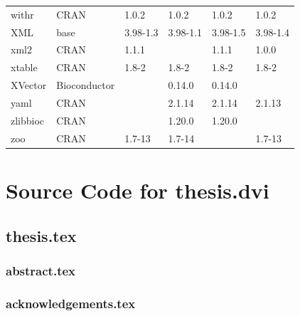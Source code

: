 \begin{longtable}{llllll}
\rowcolor{black!5}
withr                         & CRAN                      & 1.0.2       & 1.0.2       & 1.0.2          & 1.0.2              \\
\rowcolor{black!10}
XML                           & base                      & 3.98-1.3    & 3.98-1.1    & 3.98-1.5       & 3.98-1.4          \\
\rowcolor{black!5}
xml2                          & CRAN                      & 1.1.1       &             & 1.1.1          & 1.0.0              \\
\rowcolor{black!10}
xtable                        & CRAN                      & 1.8-2       & 1.8-2       & 1.8-2          & 1.8-2             \\
\rowcolor{black!5}
XVector                       & Bioconductor              &             & 0.14.0      & 0.14.0         &                    \\
\rowcolor{black!10}
yaml                          & CRAN                      &             & 2.1.14      & 2.1.14         & 2.1.13            \\
\rowcolor{black!5}
zlibbioc                      & CRAN                      &             & 1.20.0      & 1.20.0         &                    \\
\rowcolor{black!10}
zoo                           & CRAN                      & 1.7-13      & 1.7-14      &                & 1.7-13            \\
\hline
\end{longtable}

\iffalse

\chapter{Source Code for thesis.dvi}

\linespread{1}
\footnotesize

\section{thesis.tex}

\subsection{abstract.tex}

\subsection{acknowledgements.tex}

